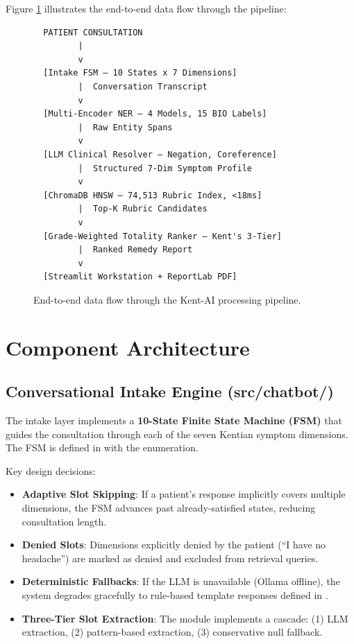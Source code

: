 Figure \ref{fig:architecture} illustrates the end-to-end data flow through the pipeline:

\begin{figure}[h]
\centering
\begin{minipage}{0.9\textwidth}
\begin{verbatim}
  PATIENT CONSULTATION
         |
         v
  [Intake FSM — 10 States x 7 Dimensions]
         |  Conversation Transcript
         v
  [Multi-Encoder NER — 4 Models, 15 BIO Labels]
         |  Raw Entity Spans
         v
  [LLM Clinical Resolver — Negation, Coreference]
         |  Structured 7-Dim Symptom Profile
         v
  [ChromaDB HNSW — 74,513 Rubric Index, <18ms]
         |  Top-K Rubric Candidates
         v
  [Grade-Weighted Totality Ranker — Kent's 3-Tier]
         |  Ranked Remedy Report
         v
  [Streamlit Workstation + ReportLab PDF]
\end{verbatim}
\end{minipage}
\caption[Kent-AI End-to-End Pipeline]{End-to-end data flow through the Kent-AI processing pipeline.}
\label{fig:architecture}
\end{figure}


\section{Component Architecture}

\subsection{Conversational Intake Engine (src/chatbot/)}

The intake layer implements a \textbf{10-State Finite State Machine (FSM)} that guides the consultation through each of the seven Kentian symptom dimensions. The FSM is defined in  with the  enumeration.

Key design decisions:
\begin{itemize}
  \item \textbf{Adaptive Slot Skipping}: If a patient's response implicitly covers multiple dimensions, the FSM advances past already-satisfied states, reducing consultation length.
  \item \textbf{Denied Slots}: Dimensions explicitly denied by the patient (``I have no headache'') are marked as denied and excluded from retrieval queries.
  \item \textbf{Deterministic Fallbacks}: If the LLM is unavailable (Ollama offline), the system degrades gracefully to rule-based template responses defined in .
  \item \textbf{Three-Tier Slot Extraction}: The  module implements a cascade: (1) LLM extraction, (2) pattern-based extraction, (3) conservative null fallback.
\end{itemize}

